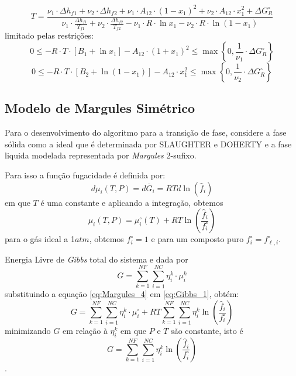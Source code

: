 \begin{equation}
T=\frac{\nu_{1}\cdot\Delta h_{f1} + \nu_{2}\cdot\Delta h_{f2}+\nu_{1}\cdot A_{12}\cdot(1-x_{1})^{2}+ \nu_{2}\cdot A_{12}\cdot x_{1}^{2} + \Delta G_{R}^{\circ}}{\nu_{1}\cdot\frac{\Delta h_{f1}}{T_{f1}}+\nu_{2}\cdot\frac{\Delta h_{f2}}{T_{f2}}-\nu_{1}\cdot R\cdot\ln x_{1}-\nu_{2}\cdot R\cdot\ln(1-x_{1})}
\label{equa_7}
\end{equation}
limitado pelas restrições:
\begin{equation}
0\leq-R\cdot T\cdot[B_{1}+\ln x_{1}]-A_{12}\cdot (1+x_{1})^{2}\leq\max\left\{0,\frac{1}{\nu_1}\cdot
\Delta G_{R}^{\circ} \right\}
\label{limite_7}
\end{equation}
\begin{equation}
0\leq-R\cdot T\cdot[B_{2}+\ln(1- x_{1})]-A_{12}\cdot x_{1}^{2}\leq\max\left\{0,\frac{1}{\nu_2}\cdot
\Delta G_{R}^{\circ} \right\}
\label{limite_8}
\end{equation}

\subsection{Modelo de Margules Simétrico}

Para o desenvolvimento do algoritmo para a transição de fase, considere a fase sólida como a ideal que é determinada por SLAUGHTER e
DOHERTY \citeyear{Douglas1995} e a fase liquida modelada representada por \textit{Margules}  2-sufixo.\cite{Rocha2009a}

Para isso a função fugacidade é definida por:
\begin{equation}\label{eq:Margules_3}
d\mu_{i}(T,P)=d\overline{G}_i=RTd\ln(\hat{f}_i)
\end{equation}
em que $T$ é uma constante e aplicando a integração, obtemos
\begin{equation}\label{eq:Margules_4}
\mu_{i}(T,P)=\mu^{\circ}_{i}(T)+RT\ln\left(\dfrac{\hat{f}_i}{f^{\circ}_{i}}\right)
\end{equation}
para o gás ideal a 1$atm$, obtemos $f^{\circ}_{i}=1$ e para um composto puro $f^{\circ}_{i}=f^{\circ}_{\ell,i}$. \cite{Rocha2009a}

Energia Livre de \textit{Gibbs} total do sistema e dada por
\begin{equation}\label{eq:Gibbs_1}
G=\sum_{k=1}^{NF}\sum_{i=1}^{NC}\eta_{i}^{k}\cdot\mu_{i}^{k}
\end{equation}
substituindo a equação \ref{eq:Margules_4} em \ref{eq:Gibbs_1}, obtém:
\begin{equation}\label{eq:Gibbs_2}
G=\sum_{k=1}^{NF}\sum_{i=1}^{NC}\eta_{i}^{k}\cdot\mu_{i}^{\circ}+RT\sum_{k=1}^{NF}\sum_{i=1}^{NC}\eta_{i}^{k}\ln\left(\dfrac{\hat{f}_i}{f^{\circ}_{i}}\right)
\end{equation}
minimizando $G$ em relação à $\eta_{i}^{k}$ em que $P$ e $T$ são constante, isto é
\begin{equation}\label{eq:Gibbs_3}
G=\sum_{k=1}^{NF}\sum_{i=1}^{NC}\eta_{i}^{k}\ln\left(\dfrac{\hat{f}_i}{f^{\circ}_{i}}\right)
\end{equation}
\cite{Rocha2009a}.

